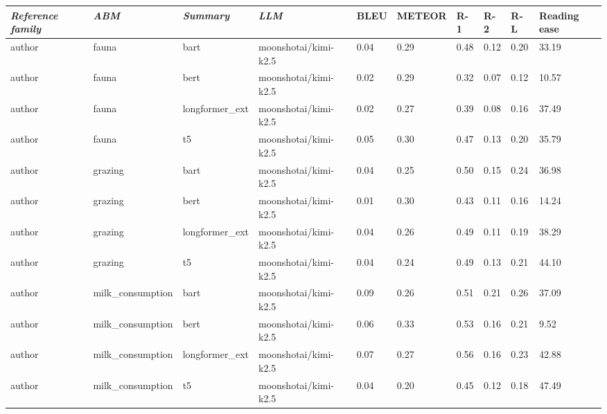 \begin{tabular}{|l|l|l|l|l|l|l|l|l|l|}
\hline
\textit{\textbf{Reference family}} & \textit{\textbf{ABM}} & \textit{\textbf{Summary}} & \textit{\textbf{LLM}} & BLEU & METEOR & R-1 & R-2 & R-L & Reading ease \\
 \hline
 author & fauna & bart & moonshotai/kimi-k2.5 & 0.04 & 0.29 & 0.48 & 0.12 & 0.20 & 33.19 \\
 \hline
 author & fauna & bert & moonshotai/kimi-k2.5 & 0.02 & 0.29 & 0.32 & 0.07 & 0.12 & 10.57 \\
 \hline
 author & fauna & longformer\_ext & moonshotai/kimi-k2.5 & 0.02 & 0.27 & 0.39 & 0.08 & 0.16 & 37.49 \\
 \hline
 author & fauna & t5 & moonshotai/kimi-k2.5 & 0.05 & 0.30 & 0.47 & 0.13 & 0.20 & 35.79 \\
 \hline
 author & grazing & bart & moonshotai/kimi-k2.5 & 0.04 & 0.25 & 0.50 & 0.15 & 0.24 & 36.98 \\
 \hline
 author & grazing & bert & moonshotai/kimi-k2.5 & 0.01 & 0.30 & 0.43 & 0.11 & 0.16 & 14.24 \\
 \hline
 author & grazing & longformer\_ext & moonshotai/kimi-k2.5 & 0.04 & 0.26 & 0.49 & 0.11 & 0.19 & 38.29 \\
 \hline
 author & grazing & t5 & moonshotai/kimi-k2.5 & 0.04 & 0.24 & 0.49 & 0.13 & 0.21 & 44.10 \\
 \hline
 author & milk\_consumption & bart & moonshotai/kimi-k2.5 & 0.09 & 0.26 & 0.51 & 0.21 & 0.26 & 37.09 \\
 \hline
 author & milk\_consumption & bert & moonshotai/kimi-k2.5 & 0.06 & 0.33 & 0.53 & 0.16 & 0.21 & 9.52 \\
 \hline
 author & milk\_consumption & longformer\_ext & moonshotai/kimi-k2.5 & 0.07 & 0.27 & 0.56 & 0.16 & 0.23 & 42.88 \\
 \hline
 author & milk\_consumption & t5 & moonshotai/kimi-k2.5 & 0.04 & 0.20 & 0.45 & 0.12 & 0.18 & 47.49 \\
\hline
\end{tabular}
